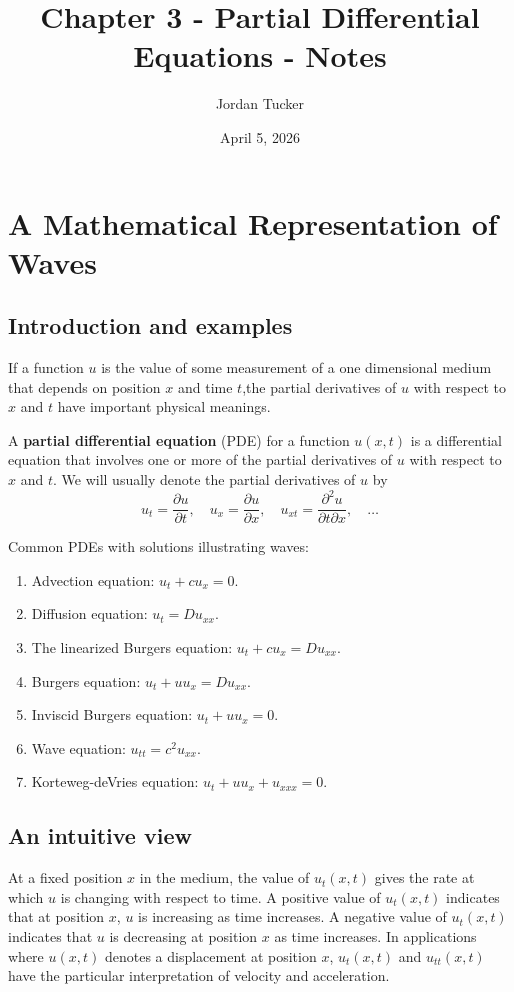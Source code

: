 \documentclass[12pt, letterpaper]{article}
\title{Chapter 3 - Partial Differential Equations - Notes}
\author{Jordan Tucker}
\date{April 5, 2026}
\begin{document}
    \maketitle
    \section{A Mathematical Representation of Waves}
    \subsection{Introduction and examples}
    If a function $u$ is the value of some measurement of a one dimensional medium that depends on
    position $x$ and time $t$,the partial derivatives of $u$ with respect to $x$ and $t$ have
    important physical meanings.

    A \textbf{partial differential equation} (PDE) for a function $u(x,t)$ is a differential equation that
    involves one or more of the partial derivatives of $u$ with respect to $x$ and $t$.
    We will usually denote the partial derivatives of $u$ by
    \[
    u_t = \frac{\partial u}{\partial t}, \quad u_x = \frac{\partial u}{\partial x}, \quad u_{xt} = \frac{\partial^2 u}{\partial t \partial x},\quad  \dots
    \]

    Common PDEs with solutions illustrating waves:
    \begin{enumerate}
        \item[(a)] Advection equation: $u_t+cu_x=0$.
        \item[(b)] Diffusion equation: $u_t=Du_{xx}$.
        \item[(c)] The linearized Burgers equation: $u_t+cu_x=Du_{xx}$.
        \item[(d)] Burgers equation: $u_t+uu_x=Du_{xx}$.
        \item[(e)] Inviscid Burgers equation: $u_t+uu_x=0$.
        \item[(f)] Wave equation: $u_{tt}=c^2 u_{xx}$.
        \item[(g)] Korteweg-deVries equation: $u_t+uu_x+u_{xxx}=0$.
    \end{enumerate}

    \subsection{An intuitive view}\label{subsec:an-intuitive-view}
    At a fixed position $x$ in the medium, the value of $u_t(x, t)$ gives the rate at which $u$ is
    changing with respect to time.
    A positive value of $u_t(x,t)$ indicates that at position $x$, $u$ is increasing as time
    increases.
    A negative value of $u_t(x,t)$ indicates that $u$ is decreasing at position $x$ as time
    increases.
    In applications where $u(x,t)$ denotes a displacement at position $x$, $u_t(x,t)$ and $u_{tt}(x,t)$
    have the particular interpretation of velocity and acceleration.
\end{document}
